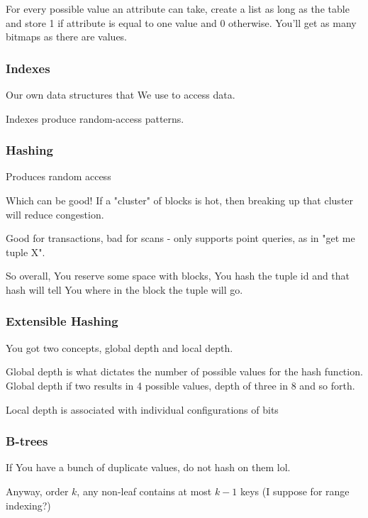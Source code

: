 \documentclass{article}
\begin{document}
				For every possible value an attribute can take, create a list as long as the table and store 1 if attribute is equal to one value and 0 otherwise. You'll get as many bitmaps as there are values.
				
			\subsubsection{Indexes}
			
				Our own data structures that We use to access data.
				
				Indexes produce random-access patterns.
				
			\subsubsection{Hashing}
			
				Produces random access
				
				Which can be good! If a "cluster" of blocks is hot, then breaking up that cluster will reduce congestion.
				
				Good for transactions, bad for scans - only supports point queries, as in "get me tuple X".
				
				So overall, You reserve some space with blocks, You hash the tuple id and that hash will tell You where in the block the tuple will go.
				
			\subsubsection{Extensible Hashing}
			
				You got two concepts, global depth and local depth.
				
				Global depth is what dictates the number of possible values for the hash function. Global depth if two results in 4 possible values, depth of three in 8 and so forth.
				
				Local depth is associated with individual configurations of bits
				
			\subsubsection{B-trees}
			
				If You have a bunch of duplicate values, do not hash on them lol.
				
				Anyway, order $k$, any non-leaf contains at most $k-1$ keys (I suppose for range indexing?)
				
\end{document}
